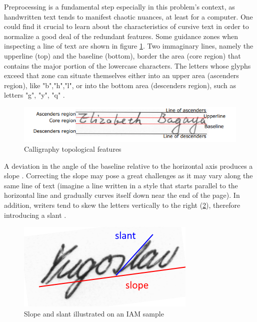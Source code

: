 Preprocessing is a fundamental step especially in this problem's context, as handwritten text tends to manifest chaotic nuances, at least for a computer. One could find it crucial to learn about the characteristics of cursive text in order to normalize a good deal of the redundant features. Some guidance zones when inspecting a line of text are shown in figure \ref{FigLineZones}. Two immaginary lines, namely the upperline (top) and the baseline (bottom), border the area (core region) that contains the major portion of the lowercase characters. The letters whose glyphs exceed that zone can situate themselves either into an upper area (ascenders region), like "b","h","l", or into the bottom area (descenders region), such as letters "g", "y", "q" \cite{Juan}.

\begin{figure}[htbp]
    \centering
        \includegraphics[scale=0.7]{figures/calligraphy_components}
    \caption{Calligraphy topological features \cite{Juan}}
    \label{FigLineZones}        
\end{figure}

A deviation in the angle of the baseline relative to the horizontal axis produces a slope \cite{Juan}. Correcting the slope may pose a great challenges as it may vary along the same line of text (imagine a line written in a style that starts parallel to the horizontal line and gradually curves itself down near the end of the page). In addition, writers tend to skew the letters vertically to the right (\ref{FigSlopeSlant}), therefore introducing a slant \cite{Juan}. 

\begin{figure}[htbp]
    \centering
        \includegraphics[scale=0.7]{figures/slope_slant.png}
    \caption{Slope and slant illustrated on an IAM sample}
    \label{FigSlopeSlant}        
\end{figure}

